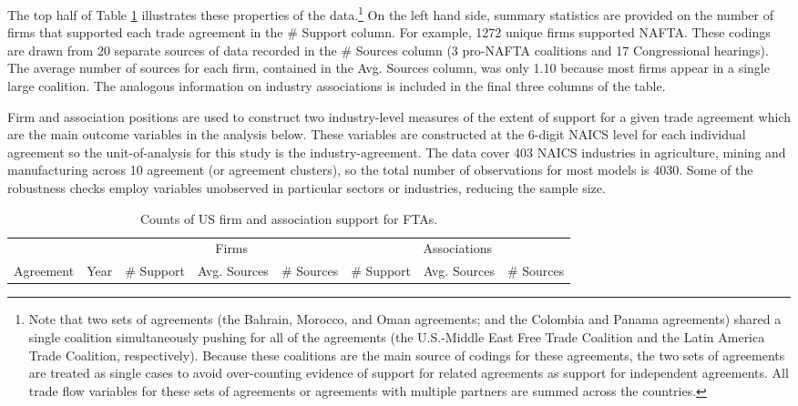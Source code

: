 \documentclass[hidelinks,12pt,letter]{article}
\begin{document}
The top half of Table \ref{tab2} illustrates these properties of the data.\footnote{Note that two sets of agreements (the Bahrain, Morocco, and Oman agreements; and the Colombia and Panama agreements) shared a single coalition simultaneously pushing for all of the agreements (the U.S.-Middle East Free Trade Coalition and the Latin America Trade Coalition, respectively). Because these coalitions are the main source of codings for these agreements, the two sets of agreements are treated as single cases to avoid over-counting evidence of support for related agreements as support for independent agreements. All trade flow variables for these sets of agreements or agreements with multiple partners are summed across the countries.} On the left hand side, summary statistics are provided on the number of firms that supported each trade agreement in the \# Support column. For example, 1272 unique firms supported NAFTA. These codings are drawn from 20 separate sources of data recorded in the \# Sources column (3 pro-NAFTA coalitions and 17 Congressional hearings). The average number of sources for each firm, contained in the Avg. Sources column, was only 1.10 because most firms appear in a single large coalition. The analogous information on industry associations is included in the final three columns of the table.

Firm and association positions are used to construct two industry-level measures of the extent of support for a given trade agreement which are the main outcome variables in the analysis below. These variables are constructed at the 6-digit NAICS level for each individual agreement so the unit-of-analysis for this study is the industry-agreement. The data cover 403 NAICS industries in agriculture, mining and manufacturing across 10 agreement (or agreement clusters), so the total number of observations for most models is $4030$. Some of the robustness checks employ variables unobserved in particular sectors or industries, reducing the sample size.

\begin{table}[t!!]\footnotesize
\setlength{\tabcolsep}{.12cm}
\centering
\caption{Counts of US firm and association support for FTAs.}
\begin{tabular}{llcccccc}
& & \multicolumn{3}{c}{Firms} & \multicolumn{3}{c}{Associations}\\
\cmidrule(l{1em}r{1em}){3-5} \cmidrule(l{1em}r{1em}){6-8}
 Agreement & Year & \# Support & Avg. Sources & \# Sources & \# Support & Avg. Sources & \# Sources \\ 
\midrule
  
   \bottomrule
\end{tabular}
\label{tab2}
\end{table}
\end{document}
